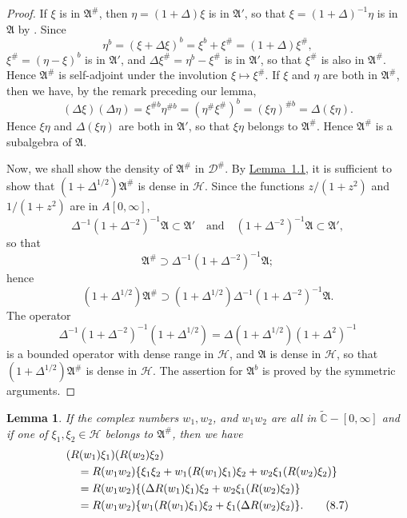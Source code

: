 \documentclass[12pt,b5paper,twoside]{article}
\theoremstyle{takesaki}
\newtheorem{lemma}{Lemma}[section]
\numberwithin{equation}{section}
\begin{document}
\begin{proof}
If $\xi$ is in $\mathfrak A^{\#}$, then
$\eta=(1+\Delta)\xi$ is in $\mathfrak A'$, so that
$\xi=(1+\Delta)^{-1}\eta$ is in $\mathfrak A$ by .
Since
\[
  \eta^b=(\xi+\Delta\xi)^b
  =\xi^b+\xi^{\#}=(1+\Delta)\xi^{\#},
\]
$\xi^{\#}=(\eta-\xi)^b$ is in $\mathfrak A'$, and
$\Delta\xi^{\#}=\eta^b-\xi^{\#}$ is in $\mathfrak A'$, so that
$\xi^{\#}$ is also in $\mathfrak A^{\#}$.  Hence
$\mathfrak A^{\#}$ is self-adjoint under the involution
$\xi\mapsto\xi^{\#}$.  If $\xi$ and $\eta$ are both in
$\mathfrak A^{\#}$, then we have, by the remark preceding our lemma,
\[
  (\Delta\xi)(\Delta\eta)
  =\xi^{\# b}\eta^{\# b}
  =(\eta^{\#}\xi^{\#})^b
  =(\xi\eta)^{\# b}
  =\Delta(\xi\eta).
\]
Hence $\xi\eta$ and $\Delta(\xi\eta)$ are both in $\mathfrak A'$, so
that $\xi\eta$ belongs to $\mathfrak A^{\#}$.  Hence
$\mathfrak A^{\#}$ is a subalgebra of $\mathfrak A$.

Now, we shall show the density of $\mathfrak A^{\#}$ in
$\mathcal D^{\#}$.  By \hyperref[lem:1.1]{Lemma~1.1}, it is sufficient
to show that $(1+\Delta^{1/2})\mathfrak A^{\#}$ is dense in
$\mathcal H$.  Since the functions $z/(1+z^2)$ and $1/(1+z^2)$ are in
$A[0,\infty]$,
\[
  \Delta^{-1}(1+\Delta^{-2})^{-1}\mathfrak A\subset\mathfrak A'
  \quad\text{and}\quad
  (1+\Delta^{-2})^{-1}\mathfrak A\subset\mathfrak A',
\]
so that
\[
  \mathfrak A^{\#}\supset
  \Delta^{-1}(1+\Delta^{-2})^{-1}\mathfrak A;
\]
hence
\[
  (1+\Delta^{1/2})\mathfrak A^{\#}\supset
  (1+\Delta^{1/2})\Delta^{-1}(1+\Delta^{-2})^{-1}\mathfrak A.
\]
The operator
\[
  \Delta^{-1}(1+\Delta^{-2})^{-1}(1+\Delta^{1/2})
  =\Delta(1+\Delta^{1/2})(1+\Delta^2)^{-1}
\]
is a bounded operator with dense range in $\mathcal H$, and
$\mathfrak A$ is dense in $\mathcal H$, so that
$(1+\Delta^{1/2})\mathfrak A^{\#}$ is dense in $\mathcal H$.  The
assertion for $\mathfrak A^b$ is proved by the symmetric arguments.
\end{proof}

\begin{lemma}\label{lem:8.4}
If the complex numbers $w_1,w_2$, and $w_1w_2$ are all in
$\widetilde{\mathbb C}-[0,\infty]$ and if one of
$\xi_1,\xi_2\in\mathcal H$ belongs to $\mathfrak A^{\#}$, then we have
\begin{align}
 &(R(w_1)\xi_1)(R(w_2)\xi_2) \notag\\
 &\quad=R(w_1w_2)\{\xi_1\xi_2
       +w_1(R(w_1)\xi_1)\xi_2
       +w_2\xi_1(R(w_2)\xi_2)\} \notag\\
 &\quad=R(w_1w_2)\{(\Delta R(w_1)\xi_1)\xi_2
       +w_2\xi_1(R(w_2)\xi_2)\} \notag\\
 &\quad=R(w_1w_2)\{w_1(R(w_1)\xi_1)\xi_2
       +\xi_1(\Delta R(w_2)\xi_2)\}.
 \tag{8.7}\label{eq:8.7}
\end{align}
\end{lemma}
\end{document}
